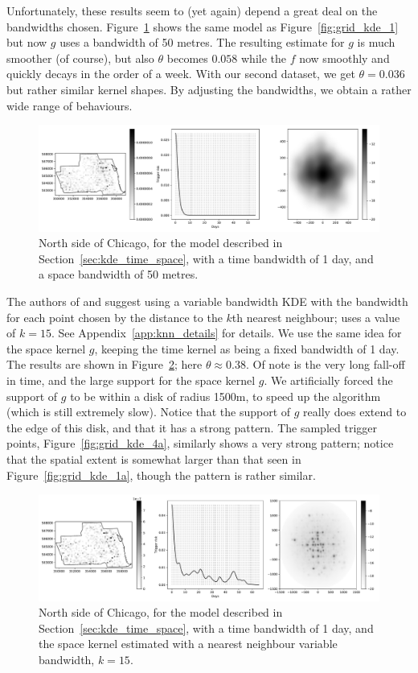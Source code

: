 \documentclass[twoside,a4paper]{article}
\theoremstyle{plain}
\theoremstyle{definition}
\begin{document}
Unfortunately, these results seem to (yet again) depend a great deal on the bandwidths chosen.
Figure~\ref{fig:grid_kde_3} shows the same model as Figure~\ref{fig:grid_kde_1} but now $g$ uses
a bandwidth of 50 metres.  The resulting estimate for $g$ is much smoother (of course), but also
$\theta$ becomes $0.058$ while the $f$ now smoothly and quickly decays in the order of a week.
With our second dataset, we get $\theta=0.036$ but rather similar kernel shapes.  By adjusting
the bandwidths, we obtain a rather wide range of behaviours.

\begin{figure}
  \includegraphics[width=\textwidth]{../notebooks/grid_kde_three.pdf}
  \caption{North side of Chicago, for the model described in Section~\ref{sec:kde_time_space},
  with a time bandwidth of 1 day, and a space bandwidth of 50 metres.}
  \label{fig:grid_kde_3}
\end{figure}

The authors of \cite{sepp} and \cite{zovj} suggest using a variable bandwidth KDE with the
bandwidth for each point chosen by the distance to the $k$th nearest neighbour; \cite{sepp}
uses a value of $k=15$.  See Appendix~\ref{app:knn_details} for details.
We use the same idea for the space kernel $g$, keeping the time
kernel as being a fixed bandwidth of 1 day.  The results are shown in Figure~\ref{fig:grid_kde_4};
here $\theta \approx 0.38$.  Of note is the very long fall-off in time, and the large support for
the space kernel $g$.  We artificially forced the support of $g$ to be within a disk of radius
1500m, to speed up the algorithm (which is still extremely slow).  Notice that the support of
$g$ really does extend to the edge of this disk, and that it has a strong pattern.  The sampled
trigger points, Figure~\ref{fig:grid_kde_4a}, similarly shows a very strong pattern; notice
that the spatial extent is somewhat larger than that seen in Figure~\ref{fig:grid_kde_1a},
though the pattern is rather similar.

\begin{figure}
  \includegraphics[width=\textwidth]{../notebooks/grid_kde_knn1.pdf}
  \caption{North side of Chicago, for the model described in Section~\ref{sec:kde_time_space},
  with a time bandwidth of 1 day, and the space kernel estimated with a nearest neighbour variable
  bandwidth, $k=15$.}
  \label{fig:grid_kde_4}
\end{figure}
\end{document}
